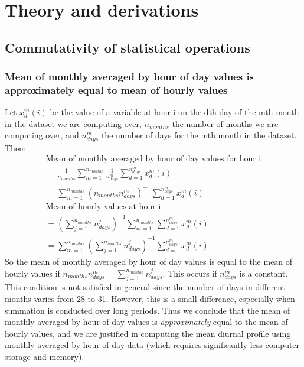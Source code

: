 \chapter{Theory and derivations}
\label{app:derive}

\section{Commutativity of statistical operations}
\label{sec:commutativity}

\subsection{Mean of monthly averaged by hour of day values is approximately equal to mean of hourly values}

Let $x^m_d(i)$ be the value of a variable at hour i on the dth day of the mth month in the dataset we are computing over, $n_{months}$ the number of months we are computing over, and $n^m_{days}$ the number of days for the mth month in the dataset. Then:
\begin{eqnarray}
	\mbox{Mean of monthly averaged by hour of day values for hour i} \\
	= \frac{1}{n_{months}} \sum_{m=1}^{n_{months}} \frac{1}{n^m_{days}} \sum_{d=1}^{n^m_{days}} x^m_d (i) \nonumber \\
	= \sum_{m=1}^{n_{months}} (n_{months} n^m_{days})^{-1} \sum_{d=1}^{n^m_{days}} x^m_d (i) \nonumber \\
	\mbox{Mean of hourly values at hour i} \\
	= \left( \sum_{j=1}^{n_{months}} n^j_{days} \right)^{-1} \sum_{m=1}^{n_{months}} \sum_{d=1}^{n^m_{days}} x^m_d (i) \nonumber \\
	= \sum_{m=1}^{n_{months}} \left( \sum_{j=1}^{n_{months}} n^j_{days} \right)^{-1} \sum_{d=1}^{n^m_{days}} x^m_d (i) \nonumber
\end{eqnarray}
So the mean of monthly averaged by hour of day values is equal to the mean of hourly values if $n_{months} n^m_{days} = \sum_{j=1}^{n_{months}} n^j_{days}$. This occurs if $n^m_{days}$ is a constant. This condition is not satisfied in general since the number of days in different months varies from 28 to 31. However, this is a small difference, especially when summation is conducted over long periods. Thus we conclude that the mean of monthly averaged by hour of day values is \textit{approximately} equal to the mean of hourly values, and we are justified in computing the mean diurnal profile using monthly averaged by hour of day data (which requires significantly less computer storage and memory).

